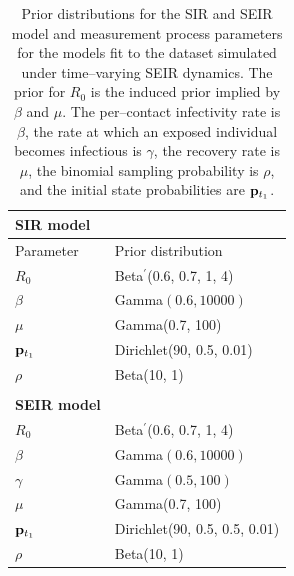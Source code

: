 \begin{table}[htbp]
	\centering
	\begin{tabular}{ll}
		\textbf{SIR model} & \\
		\hline\hline
		Parameter & Prior distribution \\ 
		\hline
		$ R_0 $ &  Beta$ ^\prime $(0.6, 0.7, 1, 4) \\
		$ \beta $ &  Gamma$ (0.6, 10000) $ \\
		$ \mu $ &  Gamma(0.7, 100) \\ 
		$ \mathbf{p}_{t_1} $ &  Dirichlet(90, 0.5, 0.01)  \\ 
		$ \rho $ &  Beta(10, 1) \\
		\hline	
		&\\
		\textbf{SEIR model} & \\
		\hline\hline
		$ R_0 $ &  Beta$ ^\prime $(0.6, 0.7, 1, 4) \\
		$ \beta $ &  Gamma$ (0.6, 10000) $ \\
		$ \gamma $ &  Gamma$ (0.5, 100) $\\ 
		$ \mu $ &  Gamma(0.7, 100) \\ 
		$ \mathbf{p}_{t_1} $ &  Dirichlet(90, 0.5, 0.5, 0.01)  \\ 
		$ \rho $ &  Beta(10, 1) \\
		\hline
	\end{tabular}
	\caption{Prior distributions for the SIR and SEIR model and measurement process parameters for the models fit to the dataset simulated under time--varying SEIR dynamics. The prior for $ R_0 $ is the induced prior implied by $ \beta $ and $ \mu $. The per--contact infectivity rate is $ \beta $, the rate at which an exposed individual becomes infectious is $ \gamma $, the recovery rate is $ \mu $, the binomial sampling probability is $ \rho $, and the initial state probabilities are $ \mathbf{p}_{t_1} $.}
	\label{tab:misspec_priors}
\end{table}

\newpage
